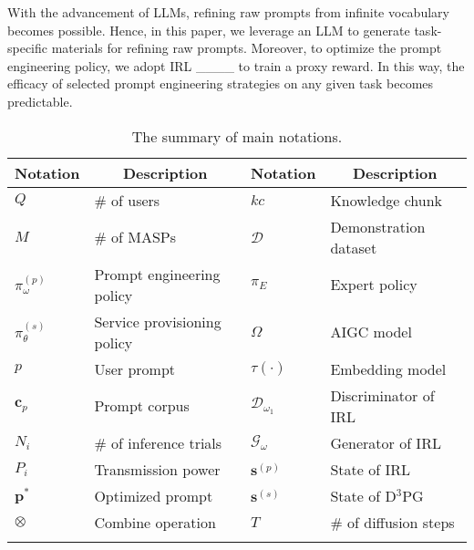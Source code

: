 With the advancement of LLMs, refining raw prompts from infinite vocabulary becomes possible.
Hence, in this paper, we leverage an LLM to generate task-specific materials for refining raw prompts.
Moreover, to optimize the prompt engineering policy, we adopt IRL ____ to train a proxy reward.
In this way, the efficacy of selected prompt engineering strategies on any given task becomes predictable.
\renewcommand{\arraystretch}{1.2}
\begin{table}
\caption{The summary of main notations.}
\begin{tabular}{l|p{2.5cm}|l|p{2.5cm}}
\Xhline{2.2pt}
\rowcolor[rgb]{0.92,0.92,0.92}
\textbf{Notation}&\multicolumn{1}{c|}{\textbf{Description}}&\textbf{Notation}&\multicolumn{1}{c}{\textbf{Description}}\\
\hline
$Q$ & \# of users & $kc$ &Knowledge chunk\\
\hline
$M$& \# of MASPs & $\mathcal{D}$ & Demonstration dataset\\
\hline
$\pi^{(p)}_\omega$ & Prompt engineering policy& $\pi_E$ & Expert policy\\
\hline
$\pi^{(s)}_\theta$ & Service provisioning policy& $\Omega$ &AIGC model\\
\hline
$p$ & User prompt& $\tau(\cdot)$ & Embedding model\\
\hline
$\mathbf{c}_p$ & Prompt corpus& $\mathcal{D}_{\omega_1}$& Discriminator of IRL\\
\hline
$N_i$& \# of inference trials & $\mathcal{G}_\omega$& Generator of IRL\\
\hline
$P_i$& Transmission power & $\mathbf{s}^{(p)}$ & State of IRL\\
\hline
$\mathbf{p}^{*}$& Optimized prompt & $\mathbf{s}^{(s)}$ & State of D$^3$PG\\
\hline
$\otimes$& Combine operation & $T$ & \# of diffusion steps\\
\Xhline{2.2pt}
\end{tabular}
\vspace{-0.2cm}
\end{table}
\renewcommand{\arraystretch}{1}